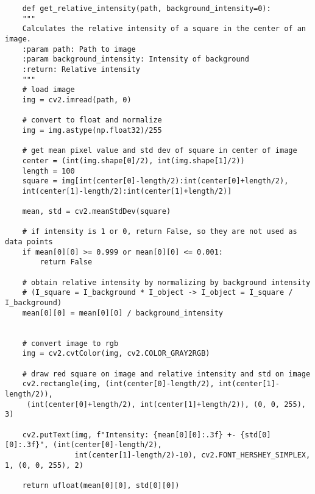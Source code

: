 \footnotesize
\begin{verbatim}
    def get_relative_intensity(path, background_intensity=0):
    """
    Calculates the relative intensity of a square in the center of an image.
    :param path: Path to image
    :param background_intensity: Intensity of background
    :return: Relative intensity
    """
    # load image
    img = cv2.imread(path, 0)

    # convert to float and normalize
    img = img.astype(np.float32)/255

    # get mean pixel value and std dev of square in center of image
    center = (int(img.shape[0]/2), int(img.shape[1]/2))
    length = 100
    square = img[int(center[0]-length/2):int(center[0]+length/2), 
    int(center[1]-length/2):int(center[1]+length/2)]

    mean, std = cv2.meanStdDev(square)

    # if intensity is 1 or 0, return False, so they are not used as data points
    if mean[0][0] >= 0.999 or mean[0][0] <= 0.001:
        return False

    # obtain relative intensity by normalizing by background intensity
    # (I_square = I_background * I_object -> I_object = I_square / I_background)
    mean[0][0] = mean[0][0] / background_intensity


    # convert image to rgb
    img = cv2.cvtColor(img, cv2.COLOR_GRAY2RGB)

    # draw red square on image and relative intensity and std on image
    cv2.rectangle(img, (int(center[0]-length/2), int(center[1]-length/2)),
     (int(center[0]+length/2), int(center[1]+length/2)), (0, 0, 255), 3)

    cv2.putText(img, f"Intensity: {mean[0][0]:.3f} +- {std[0][0]:.3f}", (int(center[0]-length/2),
                int(center[1]-length/2)-10), cv2.FONT_HERSHEY_SIMPLEX, 1, (0, 0, 255), 2)

    return ufloat(mean[0][0], std[0][0])
\end{verbatim}